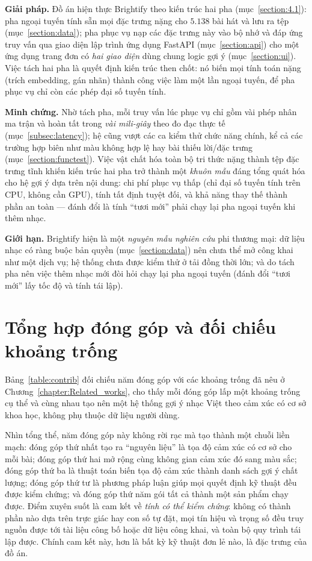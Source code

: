 \documentclass[../DoAn.tex]{subfiles}
\begin{document}
\textbf{Giải pháp.} Đồ án hiện thực Brightify theo kiến trúc hai pha (mục~\ref{section:4.1}): pha ngoại tuyến tính sẵn mọi đặc trưng nặng cho $5.138$ bài hát và lưu ra tệp (mục~\ref{section:data}); pha phục vụ nạp các đặc trưng này vào bộ nhớ và đáp ứng truy vấn qua giao diện lập trình ứng dụng FastAPI (mục~\ref{section:api}) cho một ứng dụng trang đơn có \textit{hai giao diện} dùng chung logic gợi ý (mục~\ref{section:ui}). Việc tách hai pha là quyết định kiến trúc then chốt: nó biến mọi tính toán nặng (trích embedding, gán nhãn) thành công việc làm một lần ngoại tuyến, để pha phục vụ chỉ còn các phép đại số tuyến tính.

\textbf{Minh chứng.} Nhờ tách pha, mỗi truy vấn lúc phục vụ chỉ gồm vài phép nhân ma trận và hoàn tất trong \textit{vài mili-giây} theo đo đạc thực tế (mục~\ref{subsec:latency}); hệ cũng vượt các ca kiểm thử chức năng chính, kể cả các trường hợp biên như màu không hợp lệ hay bài thiếu lời/đặc trưng (mục~\ref{section:functest}). Việc vật chất hóa toàn bộ tri thức nặng thành tệp đặc trưng tĩnh khiến kiến trúc hai pha trở thành một \textit{khuôn mẫu} đáng tổng quát hóa cho hệ gợi ý dựa trên nội dung: chi phí phục vụ thấp (chỉ đại số tuyến tính trên CPU, không cần GPU), tính tất định tuyệt đối, và khả năng thay thế thành phần an toàn --- đánh đổi là tính ``tươi mới'' phải chạy lại pha ngoại tuyến khi thêm nhạc.

\textbf{Giới hạn.} Brightify hiện là một \textit{nguyên mẫu nghiên cứu} phi thương mại: dữ liệu nhạc có ràng buộc bản quyền (mục~\ref{section:data}) nên chưa thể mở công khai như một dịch vụ; hệ thống chưa được kiểm thử ở tải đồng thời lớn; và do tách pha nên việc thêm nhạc mới đòi hỏi chạy lại pha ngoại tuyến (đánh đổi ``tươi mới'' lấy tốc độ và tính tái lập).

\section{Tổng hợp đóng góp và đối chiếu khoảng trống}
\label{section:5.6}
Bảng~\ref{table:contrib} đối chiếu năm đóng góp với các khoảng trống đã nêu ở Chương~\ref{chapter:Related_works}, cho thấy mỗi đóng góp lấp một khoảng trống cụ thể và cùng nhau tạo nên một hệ thống gợi ý nhạc Việt theo cảm xúc có cơ sở khoa học, không phụ thuộc dữ liệu người dùng.

Nhìn tổng thể, năm đóng góp này không rời rạc mà tạo thành một chuỗi liền mạch: đóng góp thứ nhất tạo ra ``nguyên liệu'' là tọa độ cảm xúc có cơ sở cho mỗi bài; đóng góp thứ hai mở rộng cùng không gian cảm xúc đó sang màu sắc; đóng góp thứ ba là thuật toán biến tọa độ cảm xúc thành danh sách gợi ý chất lượng; đóng góp thứ tư là phương pháp luận giúp mọi quyết định kỹ thuật đều được kiểm chứng; và đóng góp thứ năm gói tất cả thành một sản phẩm chạy được. Điểm xuyên suốt là cam kết về \textit{tính có thể kiểm chứng}: không có thành phần nào dựa trên trực giác hay con số tự đặt, mọi tín hiệu và trọng số đều truy nguồn được tới tài liệu công bố hoặc dữ liệu công khai, và toàn bộ quy trình tái lập được. Chính cam kết này, hơn là bất kỳ kỹ thuật đơn lẻ nào, là đặc trưng của đồ án.
\end{document}
